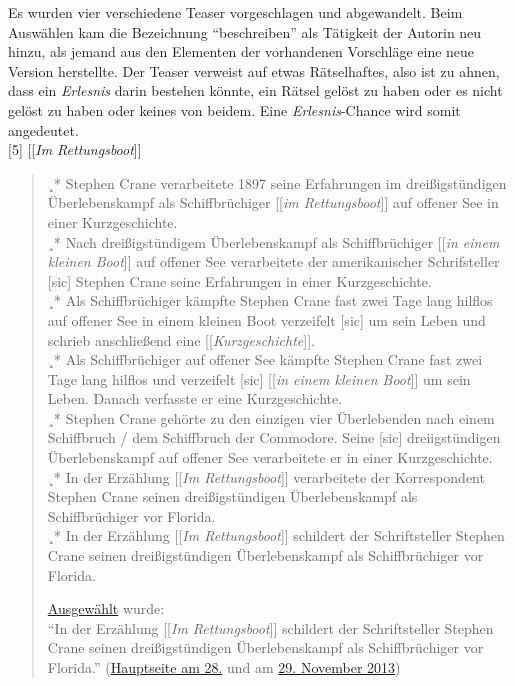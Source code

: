 \documentclass[fontsize=12pt]{scrartcl}
\begin{document}
Es wurden \mbox{vier} verschiedene Teaser vorgeschlagen und abgewandelt. Beim Ausw\"ah\-len kam die Be\-zeichnung "`beschrei\-ben"' als T\"atigkeit der Autorin\textsuperscript{\tiny *} neu hinzu, als jemand aus den Elementen der vorhandenen Vorschl\"age eine neue Version herstellte. Der Teaser verweist auf etwas R\"atselhaftes, also ist zu ahnen, dass ein \textit{Erlesnis} darin bestehen k\"onnte, ein R\"atsel gel\"ost zu haben oder es nicht gel\"ost zu haben oder keines von beidem. Eine \textit{Erlesnis}-Chance wird somit angedeutet.\\

[5] [[\textit{Im Rettungsboot}]]
\singlespacing
\begin{quote}
¸* Stephen Crane verarbeitete 1897 seine Erfah\-rungen im drei{\ss}ig\-st\"un\-di\-gen \"Uberlebenskampf als Schiffbr\"uchiger [[\textit{im Rettungsboot}]] auf offener See in einer Kurzgeschichte.\\
¸* Nach drei{\ss}igst\"un\-di\-gem \"Uberlebenskampf als Schiffbr\"uchiger [[\textit{in einem kleinen Boot}]] auf offener See verarbeitete der amerikanischer Schrifsteller [sic] Stephen Crane seine Erfah\-rungen in einer Kurzgeschichte.\\
¸* Als Schiffbr\"uchiger k\"ampfte Stephen Crane fast zwei Tage lang hilflos auf offener See in einem kleinen Boot verzeifelt [sic] um sein Leben und schrieb anschlie{\ss}end eine [[\textit{Kurzgeschichte}]].\\
¸* Als Schiffbr\"uchiger auf offener See k\"ampfte Stephen Crane fast zwei Tage lang hilflos und verzeifelt [sic] [[\textit{in einem kleinen Boot}]] um sein Leben. Danach verfasste er eine Kurzgeschichte.\\
¸* Stephen Crane geh\"orte zu den einzigen \mbox{vier} \"Uberlebenden nach einem Schiffbruch / dem Schiffbruch der Commodore. Seine [sic] drei\-{\ss}ig\-st\"un\-digen \"Uberlebenskampf auf offener See verarbeitete er in einer Kurz\-ge\-schich\-te.\\
¸* In der Erz\"ahlung [[\textit{Im Rettungsboot}]] verarbeitete der Korrespondent Stephen Crane seinen drei{\ss}igst\"undigen \"Uber\-lebens\-kampf als Schiff\-br\"u\-chiger vor Florida.\\
¸* In der Erz\"ahlung [[\textit{Im Rettungsboot}]] schil\-dert der Schriftsteller Stephen Crane seinen drei{\ss}igst\"undigen \"Uber\-lebens\-kampf als Schiff\-br\"uch\-iger vor Florida.

\href{https://de.wikipedia.org/wiki/Wikipedia_Diskussion:Hauptseite/Schon_gewusst/Diskussionsarchiv/2013/November#Eigenvorschlag:_Im_Rettungsboot_.2813._Oktober_2013.29_.28erl..29}{Ausgew\"ahlt} wurde:\\
"`In der Erz\"ahlung [[\textit{Im Rettungsboot}]] schil\-dert der Schriftsteller Stephen Crane seinen drei{\ss}igst\"undigen \"Uberlebenskampf als Schiffbr\"uchiger vor Florida."' (\href{https://de.wikipedia.org/wiki/Wikipedia:Hauptseite/Archiv/28._November_2013}{Hauptseite am 28.} und am \href{https://de.wikipedia.org/wiki/Wikipedia:Hauptseite/Archiv/29._November_2013}{29. November 2013})
\end{quote}
\onehalfspacing
\end{document}
